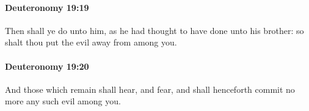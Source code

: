 		\paragraph{Deuteronomy 19:19} %
			\label{DEUTERONOMY-19-19}

			Then shall ye do unto him, as he had thought to have done unto his brother: so shalt thou put the evil away from among you.


		\paragraph{Deuteronomy 19:20} %
			\label{DEUTERONOMY-19-20}

			And those which remain shall hear, and fear, and shall henceforth commit no more any such evil among you.


